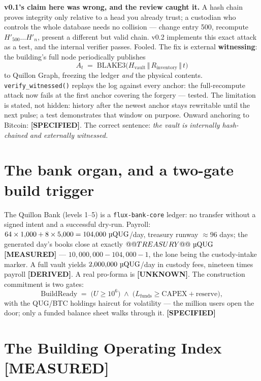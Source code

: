 \documentclass[11pt,a4paper]{article}
\newcommand{\uqug}{\text{\textmu QUG}}
\newcommand{\claim}[1]{\textcolor{qsteel}{\textbf{\footnotesize[#1]}}}
\begin{document}
\textbf{v0.1's claim here was wrong, and the review caught it.} A hash chain
proves integrity only relative to a head you already trust; a custodian who
controls the whole database needs no collision --- change entry 500, recompute
$H'_{500} \ldots H'_n$, present a different but valid chain. v0.2 implements this
exact attack as a test, and the internal verifier passes. Fooled. The fix is
external \textbf{witnessing}: the building's full node periodically publishes
\[
A_t \;=\; \mathrm{BLAKE3}\big(H_{\text{vault}} \,\Vert\, R_{\text{inventory}}
\,\Vert\, t\big)
\]
to Quillon Graph, freezing the ledger \emph{and} the physical contents.
\texttt{verify\_witnessed()} replays the log against every anchor: the
full-recompute attack now fails at the first anchor covering the forgery ---
tested. The limitation is stated, not hidden: history after the newest anchor
stays rewritable until the next pulse; a test demonstrates that window on
purpose. Onward anchoring to Bitcoin: \claim{SPECIFIED}. The correct sentence:
\emph{the vault is internally hash-chained and externally witnessed.}

\section{The bank organ, and a two-gate build trigger}

The Quillon Bank (levels 1--5) is a \texttt{flux-bank-core} ledger: no transfer
without a signed intent and a successful dry-run. Payroll:
$64 \times 1{,}000 + 8 \times 5{,}000 = 104{,}000\ \uqug$/day, treasury runway
$\approx 96$ days; the generated day's books close at exactly
$@@TREASURY@@\ \uqug$ \claim{MEASURED} ---
$10{,}000{,}000 - 104{,}000 - 1$, the lone \uqug{} being the custody-intake
marker. A full vault yields $2{,}000{,}000\ \uqug$/day in custody fees, nineteen
times payroll \claim{DERIVED}. A real pro-forma is \claim{UNKNOWN}. The
construction commitment is two gates:
\[
\text{BuildReady} \;=\; \big(U \geq 10^6\big) \;\land\;
\big(L_{\text{funds}} \geq \text{CAPEX} + \text{reserve}\big),
\]
with the QUG/BTC holdings haircut for volatility --- the million users open the
door; only a funded balance sheet walks through it. \claim{SPECIFIED}

\section{The Building Operating Index \hfill \claim{MEASURED}}
\end{document}
